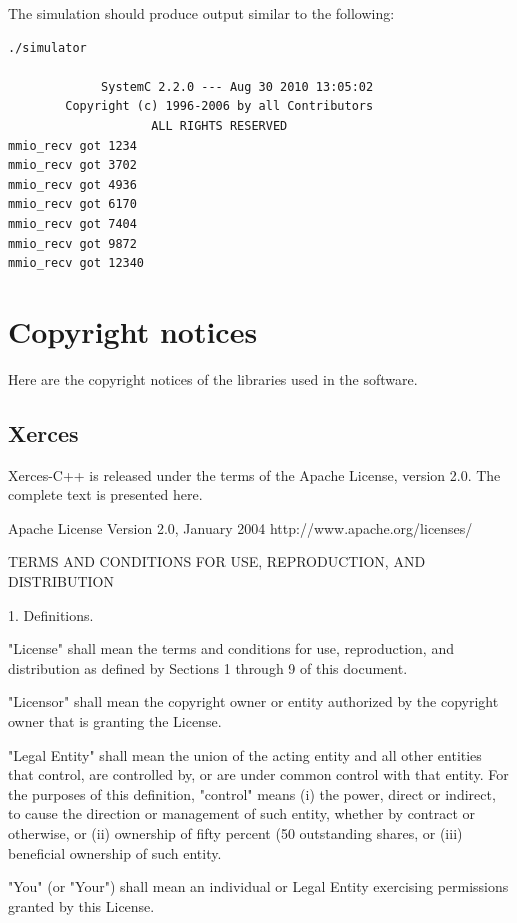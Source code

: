 \documentclass[twoside]{tceusermanual}
\begin{document}
The simulation should produce output similar to the following:

\begin{verbatim}
./simulator

             SystemC 2.2.0 --- Aug 30 2010 13:05:02
        Copyright (c) 1996-2006 by all Contributors
                    ALL RIGHTS RESERVED
mmio_recv got 1234
mmio_recv got 3702
mmio_recv got 4936
mmio_recv got 6170
mmio_recv got 7404
mmio_recv got 9872
mmio_recv got 12340
\end{verbatim}


\chapter{Copyright notices}

Here are the copyright notices of the libraries used in the software.

\section{Xerces}

Xerces-C++ is released under the terms of the Apache License, version
2.0.  The complete text is presented here.


                                 Apache License
                           Version 2.0, January 2004
                        http://www.apache.org/licenses/

   TERMS AND CONDITIONS FOR USE, REPRODUCTION, AND DISTRIBUTION

   1. Definitions.

      "License" shall mean the terms and conditions for use, reproduction,
      and distribution as defined by Sections 1 through 9 of this document.

      "Licensor" shall mean the copyright owner or entity authorized by
      the copyright owner that is granting the License.

      "Legal Entity" shall mean the union of the acting entity and all
      other entities that control, are controlled by, or are under common
      control with that entity. For the purposes of this definition,
      "control" means (i) the power, direct or indirect, to cause the
      direction or management of such entity, whether by contract or
      otherwise, or (ii) ownership of fifty percent (50%
      outstanding shares, or (iii) beneficial ownership of such entity.

      "You" (or "Your") shall mean an individual or Legal Entity
      exercising permissions granted by this License.
\end{document}
